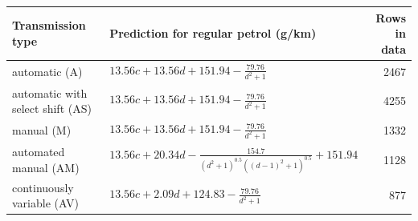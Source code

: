 \begin{tabular}{llr}
\hline
Transmission type & Prediction for regular petrol (g/km) & Rows in data \\
\hline
automatic (A) & $13.56 c + 13.56 d + 151.94 - \frac{79.76}{d^{2} + 1}$ & 2467 \\
automatic with select shift (AS) & $13.56 c + 13.56 d + 151.94 - \frac{79.76}{d^{2} + 1}$ & 4255 \\
manual (M) & $13.56 c + 13.56 d + 151.94 - \frac{79.76}{d^{2} + 1}$ & 1332 \\
automated manual (AM) & $13.56 c + 20.34 d - \frac{154.7}{\left(d^{2} + 1\right)^{0.5} \left(\left(d - 1\right)^{2} + 1\right)^{0.5}} + 151.94$ & 1128 \\
continuously variable (AV) & $13.56 c + 2.09 d + 124.83 - \frac{79.76}{d^{2} + 1}$ & 877 \\
\hline
\end{tabular}
